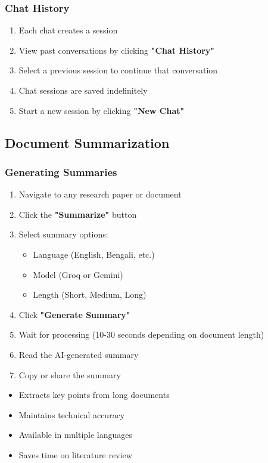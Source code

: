 \documentclass[12pt,a4paper]{article}
\begin{document}
\subsubsection{Chat History}
\begin{enumerate}[leftmargin=*]
    \item Each chat creates a session
    \item View past conversations by clicking \textbf{"Chat History"}
    \item Select a previous session to continue that conversation
    \item Chat sessions are saved indefinitely
    \item Start a new session by clicking \textbf{"New Chat"}
\end{enumerate}

\subsection{Document Summarization}

\subsubsection{Generating Summaries}
\begin{enumerate}[leftmargin=*]
    \item Navigate to any research paper or document
    \item Click the \textbf{"Summarize"} button
    \item Select summary options:
        \begin{itemize}
            \item Language (English, Bengali, etc.)
            \item Model (Groq or Gemini)
            \item Length (Short, Medium, Long)
        \end{itemize}
    \item Click \textbf{"Generate Summary"}
    \item Wait for processing (10-30 seconds depending on document length)
    \item Read the AI-generated summary
    \item Copy or share the summary
\end{enumerate}

\begin{tcolorbox}[colback=yellow!10!white,colframe=orange,title=Summary Features]
\begin{itemize}[leftmargin=*]
    \item Extracts key points from long documents
    \item Maintains technical accuracy
    \item Available in multiple languages
    \item Saves time on literature review
\end{itemize}
\end{tcolorbox}
\end{document}
